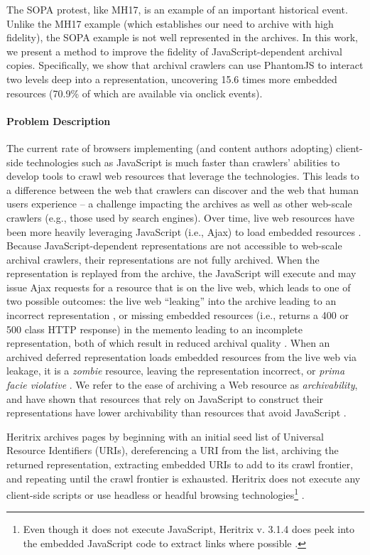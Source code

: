 \documentclass{sig-alternate}
\begin{document}
The SOPA protest, like MH17, is an example of an important historical event. Unlike the MH17 example (which establishes our need to archive with high fidelity), the SOPA example is not well represented in the archives. In this work, we present a method to improve the fidelity of JavaScript-dependent archival copies. Specifically, we show that archival crawlers can use PhantomJS to interact two levels deep into a representation, uncovering 15.6 times more embedded resources (70.9\% of which are available via onclick events).


\paragraph{Problem Description}
\label{problem}

The current rate of browsers implementing (and content authors adopting) client-side technologies such as JavaScript is much faster than crawlers' abilities to develop tools to crawl web resources that leverage the technologies. This leads to a difference between the web that crawlers can discover and the web that human users experience -- a challenge impacting the archives as well as other web-scale crawlers (e.g., those used by search engines). Over time, live web resources have been more heavily leveraging JavaScript (i.e., Ajax) to load embedded resources \cite{ijdl}. Because JavaScript-dependent representations are not accessible to web-scale archival crawlers, their representations are not fully archived. When the representation is replayed from the archive, the JavaScript will execute and may issue Ajax requests for a resource that is  on the live web, which leads to one of two possible outcomes: the live web ``leaking'' into the archive leading to an incorrect representation \cite{zombies}, or missing embedded resources (i.e., returns a 400 or 500 class HTTP response) in the memento leading to an incomplete representation, both of which result in reduced archival quality \cite{brunelleDamage}. When an archived deferred representation loads embedded resources from the live web via leakage, it is a \emph{zombie} resource, leaving the representation incorrect, or \emph{prima facie violative} \cite{ainsworthFramework}.
We refer to the ease of archiving a Web resource as \emph{archivability}, and have shown that resources that rely on JavaScript to construct their representations have lower archivability than resources that avoid JavaScript \cite{ijdl}.


Heritrix archives pages by beginning with an initial seed list of Universal Resource Identifiers (URIs), dereferencing a URI from the list, archiving the returned representation, extracting embedded URIs to add to its crawl frontier, and repeating until the crawl frontier is exhausted. Heritrix does not execute any client-side scripts or use headless or headful browsing technologies\footnote{Even though it does not execute JavaScript, Heritrix v. 3.1.4 does peek into the embedded JavaScript code to extract links where possible \cite{htrixJS}.} \cite{googleJS}. 
\end{document}
